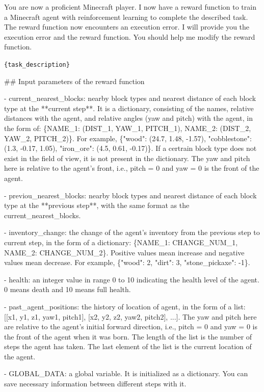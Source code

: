 

You are now a proficient Minecraft player. I now have a reward function to train a Minecraft agent with reinforcement learning to complete the described task. The reward function now encounters an execution error. I will provide you the execution error and the reward function. You should help me modify the reward function.



\texttt{\{task\_description\}}



\#\# Input parameters of the reward function

- current\_nearest\_blocks: nearby block types and nearest distance of each block type at the **current step**. It is a dictionary, consisting of the names, relative distances with the agent, and relative angles (yaw and pitch) with the agent, in the form of: \{NAME\_1: (DIST\_1, YAW\_1, PITCH\_1), NAME\_2: (DIST\_2, YAW\_2, PITCH\_2)\}. For example, \{"wood": (24.7, 1.48, -1.57), "cobblestone": (1.3, -0.17, 1.05), "iron\_ore": (4.5, 0.61, -0.17)\}. If a certrain block type does not exist in the field of view, it is not present in the dictionary. The yaw and pitch here is relative to the agent's front, i.e., pitch = 0 and yaw = 0 is the front of the agent.

- previou\_nearest\_blocks: nearby block types and nearest distance of each block type at the **previous step**, with the same format as the current\_nearest\_blocks.

- inventory\_change: the change of the agent's inventory from the previous step to current step, in the form of a dictionary: \{NAME\_1: CHANGE\_NUM\_1, NAME\_2: CHANGE\_NUM\_2\}. Positive values mean increase and negative values mean decrease. For example, \{"wood": 2, "dirt": 3, "stone\_pickaxe": -1\}.

- health: an integer value in range 0 to 10 indicating the health level of the agent. 0 means death and 10 means full health.

- past\_agent\_positions: the history of location of agent, in the form of a list: [[x1, y1, z1, yaw1, pitch1], [x2, y2, z2, yaw2, pitch2], ...]. The yaw and pitch here are relative to the agent's initial forward direction, i.e., pitch = 0 and yaw = 0 is the front of the agent when it was born. The length of the list is the number of steps the agent has taken. The last element of the list is the current location of the agent.

- GLOBAL\_DATA: a global variable. It is initialized as a dictionary. You can save necessary information between different steps with it.





